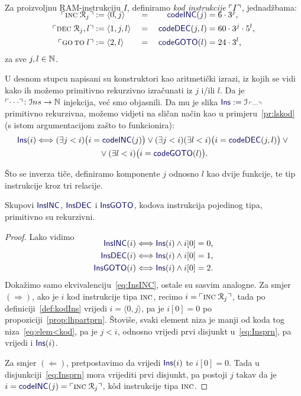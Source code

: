 \begin{definicija}\label{def:kodIns}
Za proizvoljnu RAM-instrukciju $I$, definiramo \emph{kod instrukcije} $\ulcorner I\urcorner$, jednadžbama:
\begin{alignat}{3}
\SwapAboveDisplaySkip
    \kins{\incr j}&:=\langle0,j\rangle&\;=\;&&\f{codeINC}(j)&=6\cdot3^j\text,\\
    \kins{\decr jl}&:=\langle1,j,l\rangle&\;=\;&&\f{codeDEC}(j,l)&=60\cdot3^j\cdot5^l\text,\\
    \kins{\goto\;l}&:=\langle2,l\rangle&\;=\;&&\f{codeGOTO}(l)&=24\cdot3^l\text,
\end{alignat}
za sve $j,l\in{\mathbb N}$.
\end{definicija}
U desnom stupcu napisani su konstruktori kao aritmetički izrazi, iz kojih se vidi kako ih možemo primitivno rekurzivno izračunati iz $j$ i\slash ili $l$. Da je $\ulcorner\cdots\urcorner\colon\mathcal Ins\to{\mathbb N}$ injekcija, već smo objasnili. Da mu je slika $\f{Ins}:=\im{\,\kins{\cdots}}$ primitivno rekurzivna, možemo vidjeti na sličan način kao u primjeru~\ref{pr:lskod} (s istom argumentacijom zašto to funkcionira):
\begin{multline}\label{eq:Insprn}
    \f{Ins}(i)\Longleftrightarrow(\exists j<i)\bigl(i=\f{codeINC}(j)\bigr)\lor(\exists j<i)(\exists l<i)\bigl(i=\f{codeDEC}(j,l)\bigr)\lor{}\\
    {}\lor(\exists l<i)\bigl(i=\f{codeGOTO}(l)\bigr)\text.
\end{multline}

Što se inverza tiče, definiramo komponente $j$ odnosno $l$ kao dvije funkcije, te tip instrukcije kroz tri relacije.

\begin{lema}\label{lm:InsTYPEprn}
Skupovi $\f{InsINC}$, $\f{InsDEC}$ i $\f{InsGOTO}$, kodova instrukcija pojedinog tipa, primitivno su rekurzivni.
\end{lema}
\begin{proof}
Lako vidimo
\begin{align}
\SwapAboveDisplaySkip
    \label{eq:InsINC}\f{InsINC}(i)&\Longleftrightarrow\f{Ins}(i)\land i[0]=0\text,\\
    \label{eq:InsDEC}\f{InsDEC}(i)&\Longleftrightarrow\f{Ins}(i)\land i[0]=1\text,\\
    \label{eq:InsGOTO}\f{InsGOTO}(i)&\Longleftrightarrow\f{Ins}(i)\land i[0]=2\text.
\end{align}
Dokažimo samo ekvivalenciju~\eqref{eq:InsINC}, ostale su sasvim analogne. Za smjer $(\Rightarrow)$, ako je $i$ kod instrukcije tipa $\textsc{inc}$, recimo $i=\ulcorner\textsc{inc}\;\mathcal R_{j}\urcorner$, tada po definiciji~\ref{def:kodIns} vrijedi $i=\langle0,j\rangle$, pa je $i[0]=0$ po propoziciji~\ref{prop:lhpartprn}. Štoviše, svaki element niza je manji od koda tog niza~\eqref{eq:elem<kod}, pa je $j<i$, odnosno vrijedi prvi disjunkt u~\eqref{eq:Insprn}, pa vrijedi i $\f{Ins}(i)$.

Za smjer $(\Leftarrow)$, pretpostavimo da vrijedi $\f{Ins}(i)$ te $i[0]=0$. Tada u disjunkciji~\eqref{eq:Insprn} mora vrijediti prvi disjunkt, pa postoji $j$ takav da je $i=\f{codeINC}(j)=\kins{\incr j}$, k\^od instrukcije tipa $\textsc{inc}$.
\end{proof}

